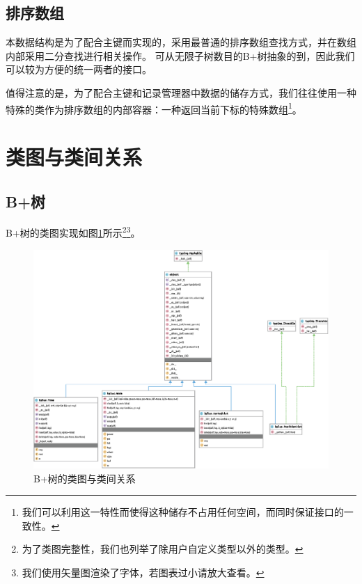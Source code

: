 \documentclass[UTF8]{ctexrep} %
\begin{document}
\subsection{排序数组}
本数据结构是为了配合主键而实现的，采用最普通的排序数组查找方式，并在数组内部采用二分查找进行相关操作。
可从无限子树数目的B+树抽象的到，因此我们可以较为方便的统一两者的接口。
\par
值得注意的是，为了配合主键和记录管理器中数据的储存方式，我们往往使用一种特殊的类作为排序数组的内部容器：一种返回当前下标的特殊数组\footnote{我们可以利用这一特性而使得这种储存不占用任何空间，而同时保证接口的一致性。}。

\section{类图与类间关系}
\subsection{B+树}
B+树的类图实现如图\ref{fig:bplus_diagram}所示\footnote{为了类图完整性，我们也列举了除用户自定义类型以外的类型。}\footnote{我们使用矢量图渲染了字体，若图表过小请放大查看。}。
\begin{figure}[H]
    \centering
    \includegraphics[width=0.85\linewidth]{figure/bplus.eps}
    \caption{B+树的类图与类间关系}
    \label{fig:bplus_diagram}
\end{figure}
\end{document}
